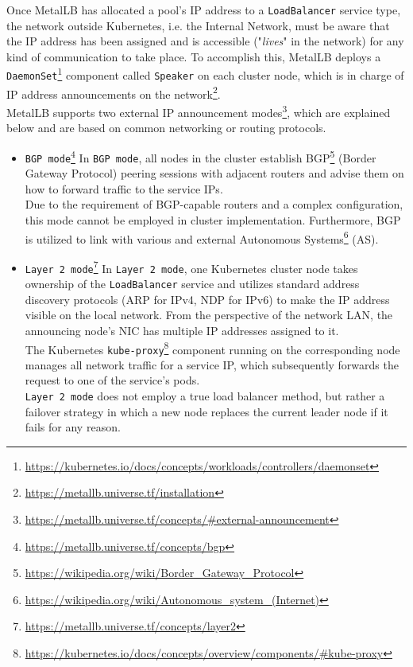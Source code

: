 Once MetalLB has allocated a pool's IP address to a \texttt{LoadBalancer} service
type, the network outside Kubernetes, i.e. the Internal Network, must be aware that
the IP address has been assigned and is accessible ("\textit{lives}" in the network)
for any kind of communication to take place. To accomplish this, MetalLB deploys
a \texttt{DaemonSet}\footnote{\url{https://kubernetes.io/docs/concepts/workloads/controllers/daemonset}}
component called \texttt{Speaker} on each cluster node, which is in charge of IP
address announcements on the network\footnote{\url{https://metallb.universe.tf/installation}}.
\\ %
MetalLB supports two external IP announcement modes\footnote{\url{https://metallb.universe.tf/concepts/\#external-announcement}},
which are explained below and are based on common networking or routing
protocols.
\begin{itemize}
  \item \texttt{BGP mode}\footnote{\url{https://metallb.universe.tf/concepts/bgp}}
    \newline
    In \texttt{BGP mode}, all nodes in the cluster establish BGP\footnote{\url{https://wikipedia.org/wiki/Border_Gateway_Protocol}}
    (Border Gateway Protocol) peering sessions with adjacent routers and advise
    them on how to forward traffic to the service IPs. \\ %
    Due to the requirement of BGP-capable routers and a complex configuration, this
    mode cannot be employed in cluster implementation. Furthermore, BGP is utilized
    to link with various and external Autonomous Systems\footnote{\url{https://wikipedia.org/wiki/Autonomous_system_(Internet)}}
    (AS).

  \item \texttt{Layer 2 mode}\footnote{\url{https://metallb.universe.tf/concepts/layer2}}
    \newline
    In \texttt{Layer 2 mode}, one Kubernetes cluster node takes ownership of the
    \texttt{LoadBalancer} service and utilizes standard address discovery protocols
    (ARP for IPv4, NDP for IPv6) to make the IP address visible on the local
    network. From the perspective of the network LAN, the announcing node's NIC
    has multiple IP addresses assigned to it. \\ %
    The Kubernetes \texttt{kube-proxy}\footnote{\url{https://kubernetes.io/docs/concepts/overview/components/\#kube-proxy}}
    component running on the corresponding node manages all network traffic for a
    service IP, which subsequently forwards the request to one of the service's
    pods. \\ %
    \texttt{Layer 2 mode} does not employ a true load balancer method, but
    rather a failover strategy in which a new node replaces the current leader
    node if it fails for any reason.
\end{itemize}
